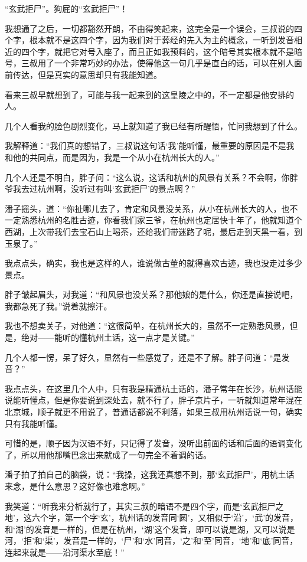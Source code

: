 “玄武拒尸”。狗屁的“玄武拒尸”！

我想通了之后，一切都豁然开朗，不由得笑起来，这完全是一个误会，三叔说的四个字，根本就不是这四个字，因为我们对于葬经的先入为主的概念，一听到发音相近的四个字，就把它对号入座了，而且正如我预料的，这个暗号其实根本就不是暗号，三叔用了一个非常巧妙的办法，使得他这一句几乎是直白的话，可以在别人面前传达，但是真实的意思却只有我能知道。

看来三叔早就想到了，可能与我一起来到的这皇陵之中的，不一定都是他安排的人。

几个人看我的脸色剧烈变化，马上就知道了我已经有所醒悟，忙问我想到了什么。

我解释道：“我们真的想错了，三叔说这句话‘我’能听懂，最重要的原因是不是我和他的共同点，而是因为，我是一个从小在杭州长大的人。”

几个人还是不明白，胖子问：“这么说，这话和杭州的风景有关系？不会啊，你胖爷我去过杭州啊，没听过有叫‘玄武拒尸’的景点啊？”

潘子摇头，道：“你扯哪儿去了，肯定和风景没关系，从小在杭州长大的人，也不一定熟悉杭州的名胜古迹，你看我们家三爷，在杭州也定居快十年了，他就知道个西湖，上次带我们去宝石山上喝茶，还给我们带迷路了呢，最后走到天黑一看，到玉泉了。”

我点点头，确实，我也是这样的人，谁说做古董的就得喜欢古迹，我也没走过多少景点。

胖子皱起眉头，对我道：“和风景也没关系？那他娘的是什么，你还是直接说吧，我都急死了我。”说着就擦汗。

我也不想卖关子，对他道：“这很简单，在杭州长大的，虽然不一定熟悉风景，但是，绝对——能听的懂杭州土话，这一点才是关键。”

几个人都一愣，呆了好久，显然有一些感觉了，还是不了解。胖子问道：“是发音？”

我点点头，在这里几个人中，只有我是精通杭土话的，潘子常年在长沙，杭州话能说能听懂点，但是你要说到深处去，就不行了，胖子京片子，一听就知道常年混在北京城，顺子就更不用说了，普通话都说不利落，如果三叔用杭州话说一句，确实只有我能听懂。

可惜的是，顺子因为汉语不好，只记得了发音，没听出前面的话和后面的语调变化了，所以用他那嘴巴念出来就成了一句完全不着调的话。

潘子拍了拍自己的脑袋，说：“我操，这我还真想不到，那‘玄武拒尸’，用杭土话来念，是什么意思？这好像也难念啊。”

我笑道：“听我来分析就行了，其实三叔的暗语不是四个字，而是‘玄武拒尸之地’，这六个字，第一个字‘玄’，杭州话的发音同‘圆’，又相似于‘沿’，‘武’的发音，和‘湖’的发音是一样的，但是在杭州，‘湖’这个发音，即可以说是湖，又可以说是河，‘拒’和‘渠’，发音是一样的，‘尸’和‘水’同音，‘之’和‘至’同音，‘地’和‘底’同音，连起来就是——沿河渠水至底！”

